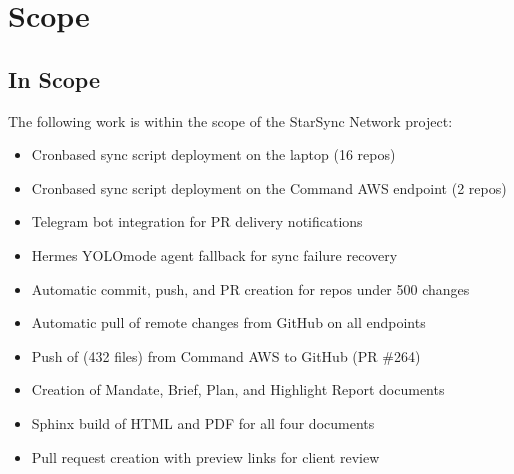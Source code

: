 \documentclass[letterpaper,10pt,openany,oneside,english]{sphinxmanual}
\begin{document}
\sphinxstepscope


\section{Scope}
\label{\detokenize{scope:scope}}\label{\detokenize{scope::doc}}

\subsection{In Scope}
\label{\detokenize{scope:in-scope}}
\sphinxAtStartPar
The following work is within the scope of the StarSync Network project:
\begin{itemize}
\item {} 
\sphinxAtStartPar
Cron\sphinxhyphen{}based sync script deployment on the laptop (16 repos)

\item {} 
\sphinxAtStartPar
Cron\sphinxhyphen{}based sync script deployment on the Command AWS endpoint (2 repos)

\item {} 
\sphinxAtStartPar
Telegram bot integration for PR delivery notifications

\item {} 
\sphinxAtStartPar
Hermes YOLO\sphinxhyphen{}mode agent fallback for sync failure recovery

\item {} 
\sphinxAtStartPar
Automatic commit, push, and PR creation for repos under 500 changes

\item {} 
\sphinxAtStartPar
Automatic pull of remote changes from GitHub on all endpoints

\item {} 
\sphinxAtStartPar
Push of  (432 files) from Command AWS to GitHub (PR \#264)

\item {} 
\sphinxAtStartPar
Creation of Mandate, Brief, Plan, and Highlight Report documents

\item {} 
\sphinxAtStartPar
Sphinx build of HTML and PDF for all four documents

\item {} 
\sphinxAtStartPar
Pull request creation with preview links for client review

\end{itemize}
\end{document}
